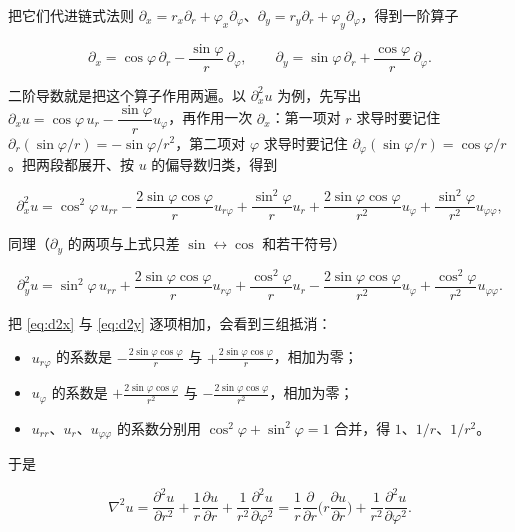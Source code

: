 把它们代进链式法则 $\partial_x=r_x\partial_r+\varphi_x\partial_\varphi$、$\partial_y=r_y\partial_r+\varphi_y\partial_\varphi$，得到一阶算子

\begin{equation}
\partial_x=\cos\varphi\,\partial_r-\frac{\sin\varphi}{r}\,\partial_\varphi,
\qquad
\partial_y=\sin\varphi\,\partial_r+\frac{\cos\varphi}{r}\,\partial_\varphi .
\label{eq:d1}
\end{equation}

二阶导数就是把这个算子作用两遍。以 $\partial_x^2u$ 为例，先写出 $\partial_xu=\cos\varphi\,u_r-\dfrac{\sin\varphi}{r}u_\varphi$，再作用一次 $\partial_x$：第一项对 $r$ 求导时要记住 $\partial_r(\sin\varphi/r)=-\sin\varphi/r^2$，第二项对 $\varphi$ 求导时要记住 $\partial_\varphi(\sin\varphi/r)=\cos\varphi/r$。把两段都展开、按 $u$ 的偏导数归类，得到

\begin{equation}
\partial_x^2u=\cos^2\varphi\,u_{rr}-\frac{2\sin\varphi\cos\varphi}{r}u_{r\varphi}
+\frac{\sin^2\varphi}{r}u_r+\frac{2\sin\varphi\cos\varphi}{r^2}u_\varphi
+\frac{\sin^2\varphi}{r^2}u_{\varphi\varphi},
\label{eq:d2x}
\end{equation}

同理（$\partial_y$ 的两项与上式只差 $\sin\leftrightarrow\cos$ 和若干符号）

\begin{equation}
\partial_y^2u=\sin^2\varphi\,u_{rr}+\frac{2\sin\varphi\cos\varphi}{r}u_{r\varphi}
+\frac{\cos^2\varphi}{r}u_r-\frac{2\sin\varphi\cos\varphi}{r^2}u_\varphi
+\frac{\cos^2\varphi}{r^2}u_{\varphi\varphi}.
\label{eq:d2y}
\end{equation}

把 \eqref{eq:d2x} 与 \eqref{eq:d2y} 逐项相加，会看到三组抵消：

\begin{itemize}
  \item $u_{r\varphi}$ 的系数是 $-\frac{2\sin\varphi\cos\varphi}{r}$ 与 $+\frac{2\sin\varphi\cos\varphi}{r}$，相加为零；
  \item $u_\varphi$ 的系数是 $+\frac{2\sin\varphi\cos\varphi}{r^2}$ 与 $-\frac{2\sin\varphi\cos\varphi}{r^2}$，相加为零；
  \item $u_{rr}$、$u_r$、$u_{\varphi\varphi}$ 的系数分别用 $\cos^2\varphi+\sin^2\varphi=1$ 合并，得 $1$、$1/r$、$1/r^2$。
\end{itemize}

于是

\begin{equation}
\nabla^2u=\frac{\partial^2u}{\partial r^2}+\frac1r\frac{\partial u}{\partial r}
+\frac1{r^2}\frac{\partial^2u}{\partial\varphi^2}
=\frac1r\frac{\partial}{\partial r}\Big(r\frac{\partial u}{\partial r}\Big)
+\frac1{r^2}\frac{\partial^2u}{\partial\varphi^2}.
\label{eq:lap}
\end{equation}

